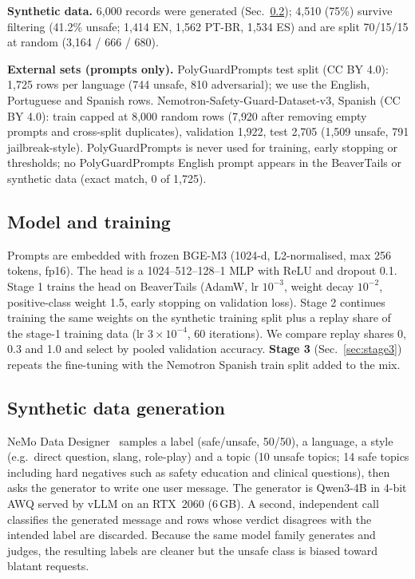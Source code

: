 \documentclass[conference]{IEEEtran}
\begin{document}
\textbf{Synthetic data.} 6{,}000 records were generated (Sec.~\ref{sec:synth}); 4{,}510 (75\%) survive filtering (41.2\% unsafe; 1{,}414 EN, 1{,}562 PT-BR, 1{,}534 ES) and are split 70/15/15 at random (3{,}164 / 666 / 680).

\textbf{External sets (prompts only).} PolyGuardPrompts test split (CC BY 4.0): 1{,}725 rows per language (744 unsafe, 810 adversarial); we use the English, Portuguese and Spanish rows. Nemotron-Safety-Guard-Dataset-v3, Spanish (CC BY 4.0): train capped at 8{,}000 random rows (7{,}920 after removing empty prompts and cross-split duplicates), validation 1{,}922, test 2{,}705 (1{,}509 unsafe, 791 jailbreak-style). PolyGuardPrompts is never used for training, early stopping or thresholds; no PolyGuardPrompts English prompt appears in the BeaverTails or synthetic data (exact match, 0 of 1{,}725).

\subsection{Model and training}
Prompts are embedded with frozen BGE-M3 (1024-d, L2-normalised, max 256 tokens, fp16). The head is a 1024--512--128--1 MLP with ReLU and dropout 0.1. Stage 1 trains the head on BeaverTails (AdamW, lr $10^{-3}$, weight decay $10^{-2}$, positive-class weight 1.5, early stopping on validation loss). Stage 2 continues training the same weights on the synthetic training split plus a replay share of the stage-1 training data (lr $3\times10^{-4}$, 60 iterations). We compare replay shares 0, 0.3 and 1.0 and select by pooled validation accuracy. \textbf{Stage 3} (Sec.~\ref{sec:stage3}) repeats the fine-tuning with the Nemotron Spanish train split added to the mix.

\subsection{Synthetic data generation}\label{sec:synth}
NeMo Data Designer~\cite{nvidia2026dd} samples a label (safe/unsafe, 50/50), a language, a style (e.g.\ direct question, slang, role-play) and a topic (10 unsafe topics; 14 safe topics including hard negatives such as safety education and clinical questions), then asks the generator to write one user message. The generator is Qwen3-4B in 4-bit AWQ served by vLLM on an RTX~2060 (6\,GB). A second, independent call classifies the generated message and rows whose verdict disagrees with the intended label are discarded. Because the same model family generates and judges, the resulting labels are cleaner but the unsafe class is biased toward blatant requests.
\end{document}

